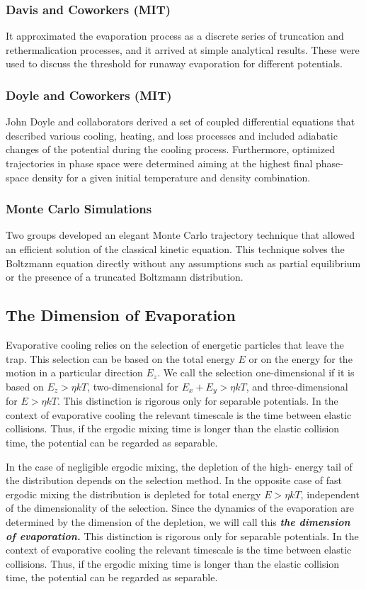 \documentclass[12]{article}
\begin{document}
  \subsubsection{Davis and Coworkers (MIT)}
  It approximated the evaporation process as a discrete series of truncation and rethermalication processes, and it arrived at simple analytical results. These were used to discuss the threshold for runaway evaporation for different potentials.     
\subsubsection{Doyle and Coworkers (MIT)}
John Doyle and collaborators derived a set of coupled differential equations that described various cooling, heating, and loss processes and included adiabatic changes of the potential during the cooling process. Furthermore, optimized trajectories in phase space were determined aiming at the highest final phase-space density for a given initial temperature and density combination.
\subsubsection{Monte Carlo Simulations}
Two groups developed an elegant Monte Carlo trajectory technique that allowed an efficient solution of the classical kinetic equation. This technique solves the Boltzmann equation directly without any assumptions such as partial equilibrium or the presence of a truncated Boltzmann distribution.      
\subsection{The Dimension of Evaporation}       
Evaporative cooling relies on the selection of energetic particles that leave the  trap. This selection can be based on the total energy $E$ or on the energy for the motion in a particular direction $E_z$. We call the selection one-dimensional if it is based on $E_z > \eta kT$, two-dimensional for $E_x +E_y > \eta kT$, and three-dimensional for $E > \eta kT$. This distinction is rigorous only for separable potentials. In the context of evaporative cooling the relevant timescale is the time between elastic collisions. Thus, if the ergodic mixing time is longer than the elastic collision time, the potential can be regarded as separable.

In the case of negligible ergodic mixing, the depletion of the high- energy tail of the distribution depends on the selection method. In the opposite case of fast ergodic mixing the distribution is depleted for total energy $E > \eta kT$, independent of the dimensionality of the selection. Since the dynamics of the evaporation are determined by the dimension of the depletion, we will call this \textbf{\textit{the dimension of evaporation.}} This distinction is rigorous only for separable potentials. In the context of evaporative cooling the relevant timescale is the time between elastic collisions. Thus, if the ergodic mixing time is longer than the elastic collision time, the potential can be regarded as separable. 
\end{document}

